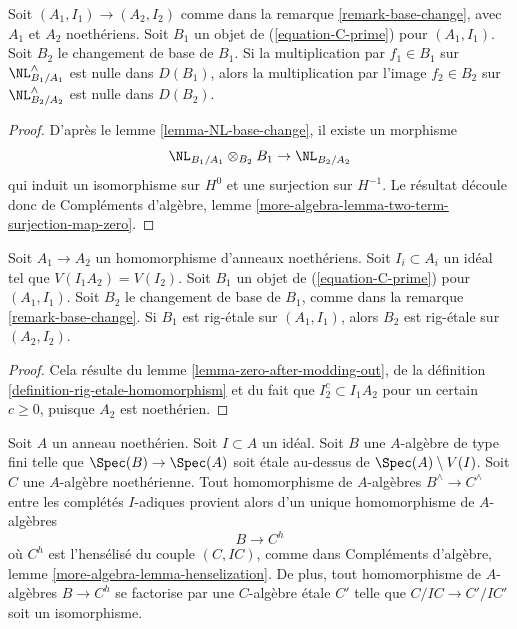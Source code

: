 \begin{lemma}
\label{lemma-zero-after-modding-out}
Soit $(A_1, I_1) \to (A_2, I_2)$ comme dans la remarque
\ref{remark-base-change}, avec $A_1$ et $A_2$ noethériens. Soit $B_1$ un objet
de (\ref{equation-C-prime}) pour $(A_1, I_1)$. Soit $B_2$ le changement de
base de $B_1$. Si la multiplication par $f_1 \in B_1$ sur
$\NL^\wedge_{B_1/A_1}$ est nulle dans $D(B_1)$, alors la multiplication par
l'image $f_2 \in B_2$ sur $\NL^\wedge_{B_2/A_2}$ est nulle dans $D(B_2)$.
\end{lemma}

\begin{proof}
D'après le lemme \ref{lemma-NL-base-change}, il existe un morphisme
$$
\NL_{B_1/A_1} \otimes_{B_2} B_1 \to \NL_{B_2/A_2}
$$
qui induit un isomorphisme sur $H^0$ et une surjection sur $H^{-1}$. Le
résultat découle donc de Compléments d'algèbre, lemme
\ref{more-algebra-lemma-two-term-surjection-map-zero}.
\end{proof}

\begin{lemma}
\label{lemma-base-change-rig-etale-homomorphism}
Soit $A_1 \to A_2$ un homomorphisme d'anneaux noethériens. Soit
$I_i \subset A_i$ un idéal tel que $V(I_1A_2) = V(I_2)$. Soit $B_1$ un objet
de (\ref{equation-C-prime}) pour $(A_1, I_1)$. Soit $B_2$ le changement de
base de $B_1$, comme dans la remarque \ref{remark-base-change}. Si $B_1$ est
rig-étale sur $(A_1, I_1)$, alors $B_2$ est rig-étale sur $(A_2, I_2)$.
\end{lemma}

\begin{proof}
Cela résulte du lemme \ref{lemma-zero-after-modding-out}, de la définition
\ref{definition-rig-etale-homomorphism} et du fait que
$I_2^c \subset I_1A_2$ pour un certain $c \geq 0$, puisque $A_2$ est
noethérien.
\end{proof}

\begin{lemma}
\label{lemma-fully-faithful-etale-over-complement}
Soit $A$ un anneau noethérien. Soit $I \subset A$ un idéal. Soit $B$ une
$A$-algèbre de type fini telle que $\Spec(B) \to \Spec(A)$ soit étale
au-dessus de $\Spec(A) \setminus V(I)$. Soit $C$ une $A$-algèbre
noethérienne. Tout homomorphisme de $A$-algèbres
$B^\wedge \to C^\wedge$ entre les complétés $I$-adiques provient alors d'un
unique homomorphisme de $A$-algèbres
$$
B \longrightarrow C^h
$$
où $C^h$ est l'hensélisé du couple $(C, IC)$, comme dans Compléments
d'algèbre, lemme \ref{more-algebra-lemma-henselization}. De plus, tout
homomorphisme de $A$-algèbres $B \to C^h$ se factorise par une $C$-algèbre
étale $C'$ telle que $C/IC \to C'/IC'$ soit un isomorphisme.
\end{lemma}


